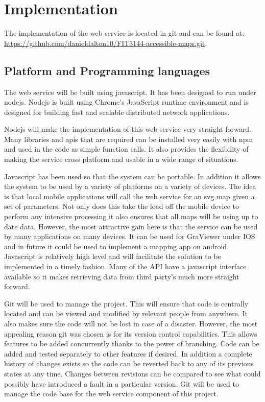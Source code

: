 \documentclass[11pt,twoside,a4paper]{article}
\begin{document}
\section{Implementation}

The implementation of the web service is located in git and can be found
at: \url{https://github.com/danieldalton10/FIT3144-accessible-maps.git}.

\subsection{Platform and Programming languages}

The web service will be built using javascript. It has been designed to
run under nodejs. Nodejs is built using  Chrome's JavaScript runtime
environment and is designed for building fast and scalable distributed
network applications.

Nodejs will make the implementation of this web service very straight
forward. Many libraries and apis that are required can be installed very
easily with npm and used in the code as simple function calls. It also
provides the flexibility of making the service cross platform and usable
in a wide range of situations.

Javascript has been used so that the system can be portable. In addition
it allows the system to be used by a variety of platforms on a variety
of devices. The idea is that local mobile applications will call the
web service for an svg map given a set of parameters. Not only does this
take the load off the mobile device to perform any intensive processing
it also ensures that all maps will be using up to date data. However,
the most attractive gain here is that the service can be used by many
applications on many devices. It can be used for GraViewer under IOS and
in future it could be used to implement a mapping app on
android. Javascript is relatively high level and will facilitate the
solution to be implemented in a timely fashion. Many of the API have a
javascript interface available so it makes retrieving data from third
party's much more straight forward.

Git will be used to manage the project. This will ensure that code is
centrally located and can be viewed and modified by relevant people from
anywhere. It also makes sure the code will not be lost in case of a
disaster. However, the most appealing reason git was chosen is for its
version control capabilities. This allows features to be added
concurrently thanks to the power of branching. Code can be added and
tested separately to other features if desired. In addition a complete
history of changes exists so the code can be reverted back to any of its
previous states at any time. Changes between revisions can be compared
to see what could possibly have introduced a fault in a particular
version. Git will be used to manage the code base for the web service
component of this project.
\end{document}
